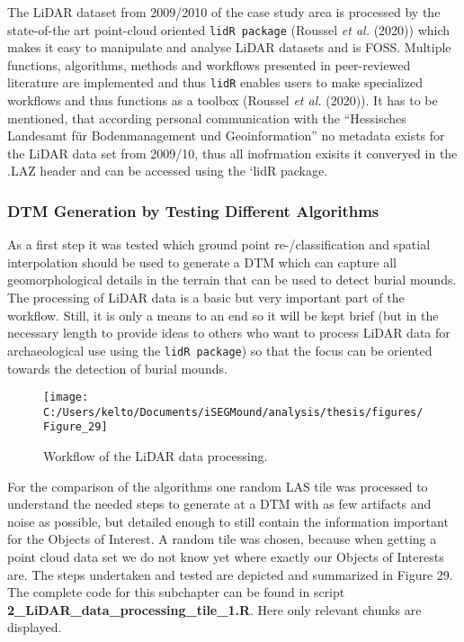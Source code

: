 \documentclass[
  12pt,
]{article}
\begin{document}
The LiDAR dataset from 2009/2010 of the case study area is processed by the state-of-the art point-cloud oriented \texttt{lidR\ package} (Roussel \emph{et al.} (2020)) which makes it easy to manipulate and analyse LiDAR datasets and is FOSS. Multiple functions, algorithms, methods and workflows presented in peer-reviewed literature are implemented and thus \texttt{lidR} enables users to make specialized workflows and thus functions as a toolbox (Roussel \emph{et al.} (2020)).
It has to be mentioned, that according personal communication with the ``Hessisches Landesamt für Bodenmanagement und Geoinformation'' no metadata exists for the LiDAR data set from 2009/10, thus all inofrmation exisits it converyed in the .LAZ header and can be accessed using the `lidR package.

\hypertarget{dtm-generation-by-testing-different-algorithms}{%
\subsubsection{\texorpdfstring{\textbf{DTM Generation by Testing Different Algorithms}}{DTM Generation by Testing Different Algorithms}}\label{dtm-generation-by-testing-different-algorithms}}

As a first step it was tested which ground point re-/classification and spatial interpolation should be used to generate a DTM which can capture all geomorphological details in the terrain that can be used to detect burial mounds. The processing of LiDAR data is a basic but very important part of the workflow. Still, it is only a means to an end so it will be kept brief (but in the necessary length to provide ideas to others who want to process LiDAR data for archaeological use using the \texttt{lidR\ package}) so that the focus can be oriented towards the detection of burial mounds.

\begin{figure}

{\centering \texttt{[image: C:/Users/kelto/Documents/iSEGMound/analysis/thesis/figures/Figure\_29]} 

}

\caption{Workflow of the LiDAR data processing.}\label{fig:Figure29}
\end{figure}

For the comparison of the algorithms one random LAS tile was processed to understand the needed steps to generate at a DTM with as few artifacts and noise as possible, but detailed enough to still contain the information important for the Objects of Interest. A random tile was chosen, because when getting a point cloud data set we do not know yet where exactly our Objects of Interests are.
The steps undertaken and tested are depicted and summarized in Figure 29. The complete code for this subchapter can be found in script \textbf{2\_LiDAR\_data\_processing\_tile\_1.R}. Here only relevant chunks are displayed.
\end{document}
